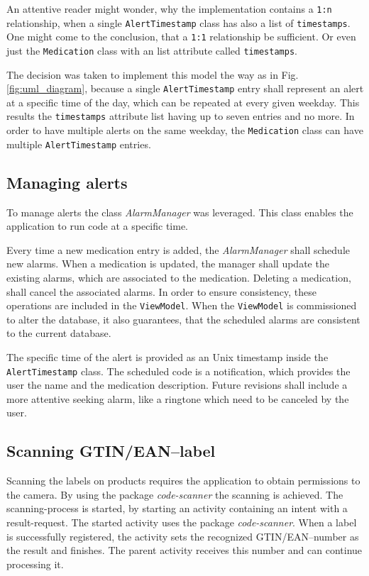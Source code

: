 \documentclass[conference]{IEEEtran}
\begin{document}
An attentive reader might wonder, why the implementation contains a \texttt{1:n} relationship, when a single
\texttt{AlertTimestamp} class has also a list of \texttt{timestamps}. One might come to the conclusion, that a
\texttt{1:1} relationship be sufficient. Or even just the \texttt{Medication} class with an list attribute called
\texttt{timestamps}.

The decision was taken to implement this model the way as in Fig. \ref{fig:uml_diagram}, because a single
\texttt{AlertTimestamp} entry shall represent an alert at a specific time of the day, which can be repeated
at every given weekday. This results the \texttt{timestamps} attribute list having up to seven entries and no
more. In order to have multiple alerts on the same weekday, the \texttt{Medication} class can have multiple 
\texttt{AlertTimestamp} entries.

\subsection{Managing alerts}

To manage alerts the class \textit{AlarmManager} \cite{alarmmanager} was leveraged. This class enables the
application to run code at a specific time.

Every time a new medication entry is added, the \textit{AlarmManager} shall schedule new alarms. When a
medication is updated, the manager shall update the existing alarms, which are associated to the
medication. Deleting a medication, shall cancel the associated alarms. In order to ensure consistency, these
operations are included in the \texttt{ViewModel}. When the \texttt{ViewModel} is commissioned to alter the 
database, it also guarantees, that the scheduled alarms are consistent to the current database.

The specific time of the alert is provided as an Unix timestamp inside the \texttt{AlertTimestamp} class.
The scheduled code is a notification, which provides the user the name and the medication description.
Future revisions shall include a more attentive seeking alarm, like a ringtone which need to be canceled
by the user.

\subsection{Scanning GTIN/EAN--label}

Scanning the labels on products requires the application to obtain permissions to the camera. By using the package
\textit{code-scanner} \cite{barcode} the scanning is achieved. The scanning-process is started, by 
starting an activity containing an intent with a result-request. The started activity uses the package
\textit{code-scanner}. When a label is successfully registered, the activity sets the recognized GTIN/EAN--number
as the result and finishes. The parent activity receives this number and can continue processing it.
\end{document}
